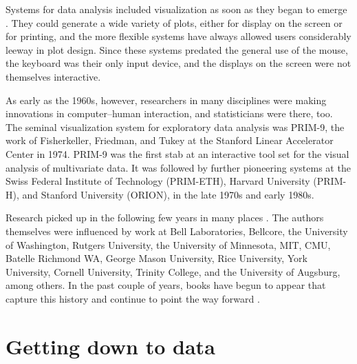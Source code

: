 

Systems for data analysis included visualization as soon as they began
to emerge \cite{SPSS68,BC84,SYSTAT84}.  They could generate a wide
variety of plots, either for display on the screen or for printing,
and the more flexible systems have always allowed users considerably
leeway in plot design.  Since these systems predated the general use
of the mouse, the keyboard was their only input device, and the
displays on the screen were not themselves interactive.

As early as the 1960s, however, researchers in many disciplines were
making innovations in computer--human interaction, and statisticians
were there, too.  The seminal visualization system for exploratory
data analysis was PRIM-9, the work of Fisherkeller, Friedman, and Tukey
at the Stanford Linear Accelerator Center in 1974.  PRIM-9 was the
first stab at an interactive tool set for the visual analysis of
multivariate data.  It was followed by further pioneering systems at
the Swiss Federal Institute of Technology (PRIM-ETH), Harvard
University (PRIM-H), and Stanford University (ORION), in the late 1970s
and early 1980s.

Research picked up in the following few years in many places
\cite{Wa78,Mc77,VeVe85,CM88,BT91,Ti91,Cl93,Rao93,CWL96}.  The authors
themselves were influenced by work at Bell Laboratories, Bellcore, the
University of Washington, Rutgers University, the University of
Minnesota, MIT, CMU, Batelle Richmond WA, George Mason University,
Rice University, York University, Cornell University, Trinity College,
and the University of Augsburg, among others.
In the past couple of years, books have begun to appear that capture
this history and continue to point the way forward
\cite{Wilkinson05,Young06,Unwin06,UHC06}.


\section{Getting down to data}

